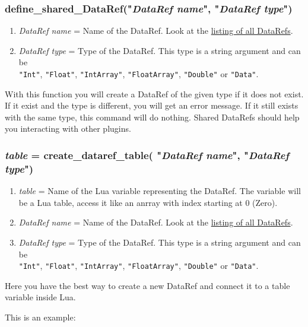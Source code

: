 \documentclass[11pt,parskip=half,a4paper]{scrartcl}
\begin{document}
\subsubsection{define\_shared\_DataRef("\emph{DataRef name}", "\emph{DataRef type}")}

\begin{enumerate}
	\item \emph{DataRef name} = Name of the DataRef. Look at the \href{http://www.xsquawkbox.net/xpsdk/docs/DataRefs.html}{listing of all DataRefs}.
	\item \emph{DataRef type} = Type of the DataRef. This type is a string argument and can be\\ \verb|"Int"|, \verb|"Float"|, \verb|"IntArray"|, \verb|"FloatArray"|, \verb|"Double"| or \verb|"Data"|.
\end{enumerate}

With this function you will create a DataRef of the given type if it does not exist. If it exist and the type is different, you will get an error message. If it still exists with the same type, this command will do nothing. Shared DataRefs should help you interacting with other plugins.


\subsubsection{\emph{table} = create\_dataref\_table( "\emph{DataRef name}", "\emph{DataRef type}")}

\begin{enumerate}
	\item \emph{table} = Name of the Lua variable representing the DataRef. The variable will be a Lua table, access it like an anrray with index starting at 0 (Zero). 
	\item \emph{DataRef name} = Name of the DataRef. Look at the \href{http://www.xsquawkbox.net/xpsdk/docs/DataRefs.html}{listing of all DataRefs}.
	\item \emph{DataRef type} = Type of the DataRef. This type is a string argument and can be\\ \verb|"Int"|, \verb|"Float"|, \verb|"IntArray"|, \verb|"FloatArray"|, \verb|"Double"| or \verb|"Data"|.
\end{enumerate}

Here you have the best way to create a new DataRef and connect it to a table variable inside Lua.

This is an example:
\end{document}
